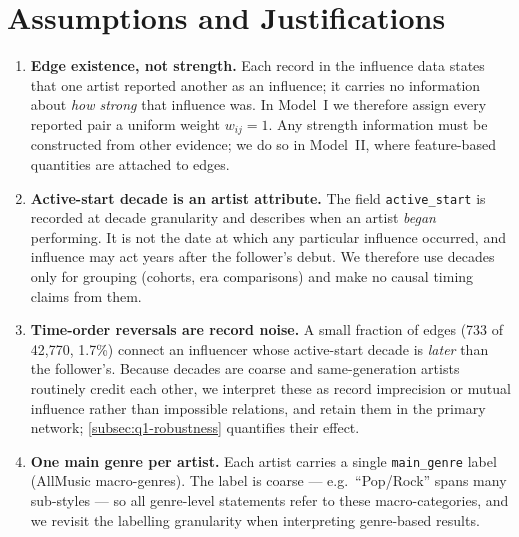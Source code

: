 \documentclass[11pt,letterpaper]{article}
\numberwithin{equation}{section}
\begin{document}
\section{Assumptions and Justifications}\label{sec:assumptions}
\begin{enumerate}[label=\textbf{A\arabic*.},leftmargin=2.2em]
  \item \label{assump:weight}
  \textbf{Edge existence, not strength.} Each record in the influence data
  states that one artist reported another as an influence; it carries no
  information about \emph{how strong} that influence was. In Model~I we
  therefore assign every reported pair a uniform weight \(w_{ij}=1\). Any
  strength information must be constructed from other evidence; we do so in
  Model~II, where feature-based quantities are attached to edges.
  \item \label{assump:decade}
  \textbf{Active-start decade is an artist attribute.} The field
  \texttt{active\_start} is recorded at decade granularity and describes when
  an artist \emph{began} performing. It is not the date at which any
  particular influence occurred, and influence may act years after the
  follower's debut. We therefore use decades only for grouping (cohorts,
  era comparisons) and make no causal timing claims from them.
  \item \label{assump:reverse}
  \textbf{Time-order reversals are record noise.} A small fraction of edges
  (733 of 42{,}770, 1.7\%) connect an influencer whose active-start decade is
  \emph{later} than the follower's. Because decades are coarse and
  same-generation artists routinely credit each other, we interpret these as
  record imprecision or mutual influence rather than impossible relations,
  and retain them in the primary network; \cref{subsec:q1-robustness}
  quantifies their effect.
  \item \label{assump:genre}
  \textbf{One main genre per artist.} Each artist carries a single
  \texttt{main\_genre} label (AllMusic macro-genres). The label is coarse ---
  e.g.\ ``Pop/Rock'' spans many sub-styles --- so all genre-level statements
  refer to these macro-categories, and we revisit the labelling granularity
  when interpreting genre-based results.
\end{enumerate}










\end{document}
